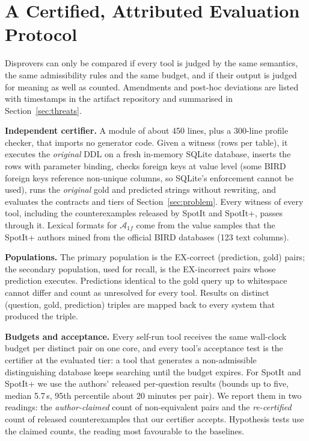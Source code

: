 \section{A Certified, Attributed Evaluation Protocol}\label{sec:protocol}

Disprovers can only be compared if every tool is judged by the same semantics, the same admissibility rules and the same budget, and if their output is judged for meaning as well as counted. Amendments and post-hoc deviations are listed with timestamps in the artifact repository and summarised in Section~\ref{sec:threats}.

\textbf{Independent certifier.} A module of about 450 lines, plus a 300-line profile checker, that imports no generator code. Given a witness (rows per table), it executes the \emph{original} DDL on a fresh in-memory SQLite database, inserts the rows with parameter binding, checks foreign keys at value level (some BIRD foreign keys reference non-unique columns, so SQLite's enforcement cannot be used), runs the \emph{original} gold and predicted strings without rewriting, and evaluates the contracts and tiers of Section~\ref{sec:problem}. Every witness of every tool, including the counterexamples released by SpotIt and SpotIt+, passes through it. Lexical formats for $\mathcal A_{1f}$ come from the value samples that the SpotIt+ authors mined from the official BIRD databases (123 text columns).

\textbf{Populations.} The primary population is the EX-correct (prediction, gold) pairs; the secondary population, used for recall, is the EX-incorrect pairs whose prediction executes. Predictions identical to the gold query up to whitespace cannot differ and count as unresolved for every tool. Results on distinct (question, gold, prediction) triples are mapped back to every system that produced the triple.

\textbf{Budgets and acceptance.} Every self-run tool receives the same wall-clock budget per distinct pair on one core, and every tool's acceptance test is the certifier at the evaluated tier: a tool that generates a non-admissible distinguishing database keeps searching until the budget expires. For SpotIt and SpotIt+ we use the authors' released per-question results (bounds up to five, median 5.7\,s, 95th percentile about 20 minutes per pair). We report them in two readings: the \emph{author-claimed} count of non-equivalent pairs and the \emph{re-certified} count of released counterexamples that our certifier accepts. Hypothesis tests use the claimed counts, the reading most favourable to the baselines.

